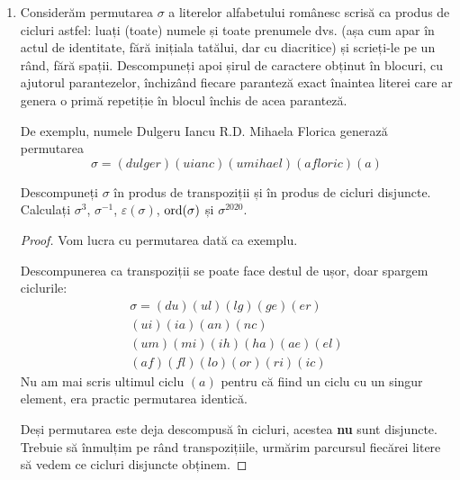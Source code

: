 \begin{enumerate}
\begin{enumerate}
\begin{proof}
    Observăm că \(730 \mid (2020 \cdot 73)\), deci există elemente de acest ordin.

    Ne folosim de raționamentul de \href{http://facstaff.cbu.edu/~wschrein/media/M402\%20Notes/M402L54.pdf}{aici}, care ne spune că numărul cerut este fix \(\phi(730)\), adică numărul de numere de la \(1\) la \(729\) inclusiv prime față de \(730\).

    Putem calcula \(\phi(730)\) foarte rapid descompunând numărul în factori primi: \(730 = 2 \cdot 5 \cdot 73\). Atunci \(\phi(730) = \phi(2 \cdot 5 \cdot 73)\), care \href{https://www.wolframalpha.com/input/?i=phi\%28730\%29}{după multe calcule} iese ca fiind \(288\).
    \end{proof}

    \item Considerăm permutarea \(\sigma\) a literelor alfabetului românesc scrisă ca produs de cicluri astfel: luați (toate) numele și toate prenumele dvs. (așa cum apar în actul de identitate, fără inițiala tatălui, dar cu diacritice) și scrieți-le pe un rând, fără spații. Descompuneți apoi șirul de caractere obținut în blocuri, cu ajutorul parantezelor, închizând fiecare paranteză exact înaintea literei care ar genera o primă repetiție în blocul închis de acea paranteză.

    De exemplu, numele Dulgeru Iancu R.D. Mihaela Florica generază permutarea
    \[\sigma = (dulger)(uianc)(umihael)(afloric)(a)\]

    Descompuneți \(\sigma\) în produs de transpoziții și în produs de cicluri disjuncte. Calculați \(\sigma^3\), \(\sigma^{-1}\), \(\varepsilon(\sigma)\), \(\operatorname{ord}(\sigma)\) și \(\sigma^{2020}\).

    \begin{proof}
    Vom lucra cu permutarea dată ca exemplu.

    Descompunerea ca transpoziții se poate face destul de ușor, doar spargem ciclurile:
    \begin{gather*}
        \sigma = (du)(ul)(lg)(ge)(er) \\
        (ui)(ia)(an)(nc) \\
        (um)(mi)(ih)(ha)(ae)(el) \\
        (af)(fl)(lo)(or)(ri)(ic)
    \end{gather*}
    Nu am mai scris ultimul ciclu \((a)\) pentru că fiind un ciclu cu un singur element, era practic permutarea identică.

    Deși permutarea este deja descompusă în cicluri, acestea \textbf{nu} sunt disjuncte. Trebuie să înmulțim pe rând transpozițiile, urmărim parcursul fiecărei litere să vedem ce cicluri disjuncte obținem.


\end{proof}
\end{enumerate}
\end{enumerate}
